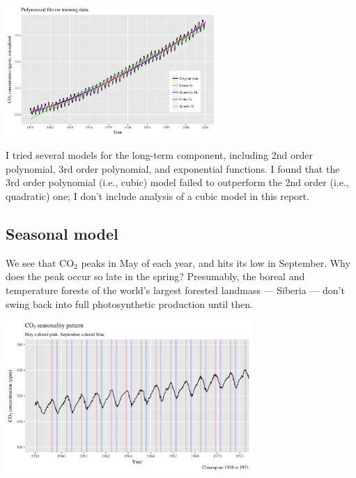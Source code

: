 \documentclass[]{article}
\let\origfigure=\figure
\let\endorigfigure=\endfigure
\renewenvironment{figure}[1][]{%
  \origfigure[H]
}{%
  \endorigfigure
}
\begin{document}
\begin{figure}
\centering
\includegraphics[width=0.6\textwidth]{mauna_loa/polynomial_fits.png}
\caption{Polynomial fits}
\end{figure}

I tried several models for the long-term component, including 2nd order
polynomial, 3rd order polynomial, and exponential functions. I found
that the 3rd order polynomial (i.e., cubic) model failed to outperform
the 2nd order (i.e., quadratic) one; I don't include analysis of a cubic
model in this report.\newline

\hypertarget{seasonal-model}{%
\subsection{Seasonal model}\label{seasonal-model}}

We see that CO\(_2\) peaks in May of each year, and hits its low in
September. Why does the peak occur so late in the spring? Presumably,
the boreal and temperature forests of the world's largest forested
landmass --- Siberia --- don't swing back into full photosynthetic
production until then.\newline

\begin{figure}
\centering
\includegraphics[width=0.7\textwidth]{mauna_loa/peaks_troughs.png}
\caption{Seasonal peaks and troughs}
\end{figure}
\end{document}
